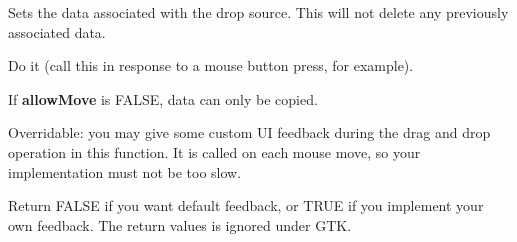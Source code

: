Sets the data  associated with the 
drop source. This will not delete any previously associated data.

\label{wxdropsourcedodragdrop}


Do it (call this in response to a mouse button press, for example).

If {\bf allowMove} is FALSE, data can only be copied.

\label{wxdropsourcegivefeedback}


Overridable: you may give some custom UI feedback during the drag and drop operation
in this function. It is called on each mouse move, so your implementation must not be too
slow.





Return FALSE if you want default feedback, or TRUE if you implement your own
feedback. The return values is ignored under GTK.

